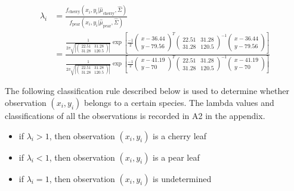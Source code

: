 \documentclass[]{article}
\providecommand{\tightlist}{%
  \setlength{\itemsep}{0pt}\setlength{\parskip}{0pt}}
\begin{document}
\begin{align*}
\lambda_i &= \frac{f_{\text{cherry}}(x_i,y_i|\hat{\mu}_{\text{cherry}}, \hat{\Sigma})}{f_{\text{pear}} (x_i,y_i|\hat{\mu}_{\text{pear}}, \hat{\Sigma})}  \\
&= \frac{\frac{1}{2\pi\sqrt{\left| \left( \begin{matrix}22.51 &31.28 \\ 31.28  & 120.5\end{matrix}\right) \right|}} 
\exp\left[\frac{-1}{2} 
\left(\begin{matrix}
x-36.44 \\ 
y-79.56
\end{matrix}\right)^T 
\left( \begin{matrix}22.51 &31.28 \\ 31.28  & 120.5\end{matrix}\right) ^{-1} 
\left(\begin{matrix}
x-36.44 \\ 
y-79.56 
\end{matrix}\right) \right]}{\frac{1}{2\pi\sqrt{\left| \left( \begin{matrix}22.51 &31.28 \\ 31.28  & 120.5\end{matrix}\right) \right|}} 
\exp\left[\frac{-1}{2} 
\left(\begin{matrix}
x-41.19 \\ 
y-70
\end{matrix}\right)^T 
\left( \begin{matrix}22.51 &31.28 \\ 31.28  & 120.5\end{matrix}\right) ^{-1} 
\left(\begin{matrix}
x-41.19 \\ 
y-70 
\end{matrix}\right) \right]}
\end{align*}

The following classification rule described below is used to determine
whether observation \((x_i, y_i)\) belongs to a certain species. The
lambda values and classifications of all the observations is recorded in
A2 in the appendix.

\begin{itemize}
\tightlist
\item
  if \(\lambda_i > 1\), then observation \((x_i, y_i)\) is a cherry leaf
\item
  if \(\lambda_i < 1\), then observation \((x_i, y_i)\) is a pear leaf
\item
  if \(\lambda_i = 1\), then observation \((x_i, y_i)\) is undetermined
\end{itemize}
\end{document}

